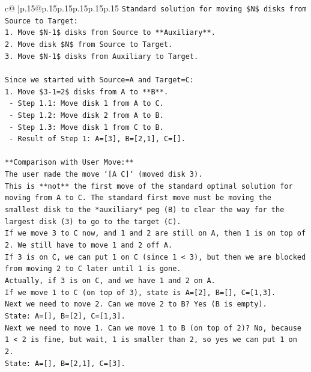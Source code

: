 \documentclass{article}
\begin{document}
{\begin{supertabular}{c@{$\;$}|p{.15\linewidth}@{}p{.15\linewidth}p{.15\linewidth}p{.15\linewidth}p{.15\linewidth}p{.15\linewidth}}
{{{\texttt{Standard solution for moving \$N\$ disks from Source to Target:} \\
\texttt{1. Move \$N{-}1\$ disks from Source to **Auxiliary**.} \\
\texttt{2. Move disk \$N\$ from Source to Target.} \\
\texttt{3. Move \$N{-}1\$ disks from Auxiliary to Target.} \\
\\ 
\texttt{Since we started with Source=A and Target=C:} \\
\texttt{1. Move \$3{-}1=2\$ disks from A to **B**.} \\
\texttt{   {-} Step 1.1: Move disk 1 from A to C.} \\
\texttt{   {-} Step 1.2: Move disk 2 from A to B.} \\
\texttt{   {-} Step 1.3: Move disk 1 from C to B.} \\
\texttt{   {-} Result of Step 1: A={[}3{]}, B={[}2,1{]}, C={[}{]}.} \\
\\ 
\texttt{**Comparison with User Move:**} \\
\texttt{The user made the move `{[}A C{]}` (moved disk 3).} \\
\texttt{This is **not** the first move of the standard optimal solution for moving from A to C. The standard first move must be moving the smallest disk to the *auxiliary* peg (B) to clear the way for the largest disk (3) to go to the target (C).} \\
\texttt{If we move 3 to C now, and 1 and 2 are still on A, then 1 is on top of 2. We still have to move 1 and 2 off A.} \\
\texttt{If 3 is on C, we can put 1 on C (since 1 < 3), but then we are blocked from moving 2 to C later until 1 is gone.} \\
\texttt{Actually, if 3 is on C, and we have 1 and 2 on A.} \\
\texttt{If we move 1 to C (on top of 3), state is A={[}2{]}, B={[}{]}, C={[}1,3{]}.} \\
\texttt{Next we need to move 2. Can we move 2 to B? Yes (B is empty).} \\
\texttt{State: A={[}{]}, B={[}2{]}, C={[}1,3{]}.} \\
\texttt{Next we need to move 1. Can we move 1 to B (on top of 2)? No, because 1 < 2 is fine, but wait, 1 is smaller than 2, so yes we can put 1 on 2.} \\
\texttt{State: A={[}{]}, B={[}2,1{]}, C={[}3{]}.} \\
}}}
\end{supertabular}}
\end{document}
